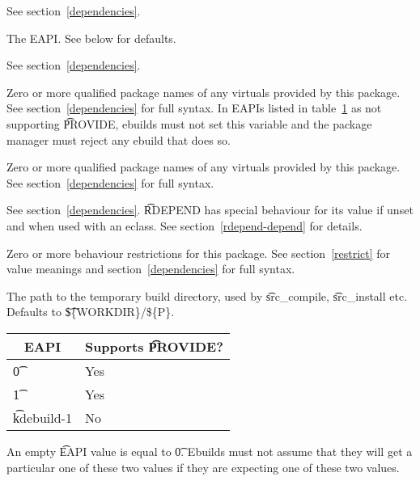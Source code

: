 \begin{description}
\item[DEPEND] See section~\ref{dependencies}.
\item[EAPI] The EAPI. See below for defaults.
\item[PDEPEND] See section~\ref{dependencies}.
\IFKDEBUILDELSE
{
    \item[PROVIDE] Zero or more qualified package names of any 
        virtuals provided by this package. See section~\ref{dependencies} for full syntax.  In EAPIs
        listed in table~\ref{provide-table} as not supporting \t{PROVIDE}, ebuilds must not set this
        variable and the package manager must reject any ebuild that does so.
        \label{ebuild-var-provide}
}{
    \item[PROVIDE] Zero or more qualified package names of any 
        virtuals provided by this package. See section~\ref{dependencies} for full syntax.
        \label{ebuild-var-provide}
}
\item[RDEPEND] See section~\ref{dependencies}. \t{RDEPEND} has special behaviour for its value if
    unset and when used with an eclass. See section~\ref{rdepend-depend} for details.
\item[RESTRICT] Zero or more behaviour restrictions for this package. See section~\ref{restrict}
    for value meanings and section~\ref{dependencies} for full syntax.
\item[S] The path to the temporary build directory, used by \t{src\_compile}, \t{src\_install}
    etc. Defaults to \t{\$\{WORKDIR\}/\$\{P\}}.
\end{description}

\IFKDEBUILDELSE
{
    \begin{table}
    \begin{center}
     \label{provide-table}
    \begin{tabular}{ l l }
        \hline
        \multicolumn{1}{c}{\textbf{EAPI}} &
        \multicolumn{1}{c}{\textbf{Supports \t{PROVIDE}?}} \\
        \hline
    \t{0} & Yes \\
    \t{1} & Yes \\
    \t{kdebuild-1} & No \\
    \hline
    \end{tabular}
    \end{center}
    \end{table}
}{
}

An empty \t{EAPI} value is equal to \t{0}. Ebuilds must not assume that they will get a particular
one of these two values if they are expecting one of these two values.

